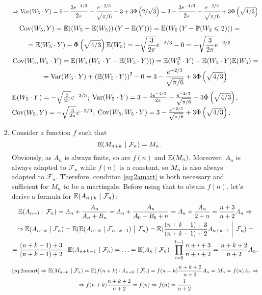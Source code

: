 \documentclass[12pt, a4paper]{article}
\newcommand{\cF}{\mathcal{F}}
\begin{document}
\begin{enumerate}
\begin{multline*}
\end{multline*}
\begin{multline*}
\Rightarrow \operatorname{Var}(W_5 \cdot Y) = 6 - \frac{3e^{-4/3}}{2\pi} - \frac{e^{-2/3}}{\sqrt{\pi/6}} - 3 + 3\Phi\left(2/\sqrt{3}\right) = 3 - \frac{3e^{-4/3}}{2\pi} - \frac{e^{-2/3}}{\sqrt{\pi/6}} + 3\Phi\left(\sqrt{4/3}\right)
\end{multline*}
\begin{multline*}
	\operatorname{Cov}(W_5,Y) = \mathbb{E}(\left(W_5 - \mathbb{E}(W_5)\right)\left(Y - \mathbb{E}(Y)\right)) = \mathbb{E}(W_5 \left(Y - \mathbb{P}(W_3 \leqslant 2)\right)) =\\
	= \mathbb{E}(W_5 \cdot Y) - \Phi\left(\sqrt{4/3}\right) \mathbb{E}(W_5) = -\sqrt{\frac{3}{2\pi}} e^{-2/3} - 0 = -\sqrt{\frac{3}{2\pi}} e^{-2/3}
\end{multline*}
\begin{multline*}
	\operatorname{Cov}(W_5,W_5 \cdot Y) = \mathbb{E}(W_5 \left(W_5 \cdot Y - \mathbb{E}(W_5 \cdot Y)\right)) = \mathbb{E}(W_5^2 \cdot Y) - \mathbb{E}(W_5 \cdot Y) \mathbb{E}(W_5) =\\
	= \operatorname{Var}(W_5 \cdot Y) + \left(\mathbb{E}(W_5 \cdot Y)\right)^2 - 0 = 3 - \frac{e^{-2/3}}{\sqrt{\pi/6}} + 3\Phi\left(\sqrt{4/3}\right)
\end{multline*}
$\mathbb{E}(W_5 \cdot Y) = -\sqrt{\frac{3}{2\pi}} e^{-2/3}$; $\operatorname{Var}(W_5 \cdot Y) = 3 - \frac{3e^{-4/3}}{2\pi} - \frac{e^{-2/3}}{\sqrt{\pi/6}} + 3\Phi\left(\sqrt{4/3}\right)$; $\operatorname{Cov}(W_5,Y) = -\sqrt{\frac{3}{2\pi}} e^{-2/3}$; $\operatorname{Cov}(W_5, W_5 \cdot Y) = 3 - \frac{e^{-2/3}}{\sqrt{\pi/6}} + 3\Phi\left(\sqrt{4/3}\right)$.


\item Consider a function $f$ such that
\begin{equation}\label{eq:2amart}
	\E(M_{n+k}\ |\ \cF_n) = M_n.
\end{equation}
Obviously, as $A_n$ is always finite, so are $f(n)$ and $\mathbb{E}(M_n)$. Moreover, $A_n$ is always adapted to $\cF_n$ while $f(n)$ is a constant, so $M_n$ is also always adapted to $\cF_n$. Therefore, condition \eqref{eq:2amart} is both necessary and sufficient for $M_n$ to be a martingale. Before using that to obtain $f(n)$, let's derive a formula for $\E(A_{n+k}\ |\ \cF_n)$:
\begin{multline*}
	\E(A_{n+1}\ |\ \cF_n) = A_n + \frac{A_n}{A_n + B_n} = A_n + \frac{A_n}{A_0 + B_0 + n} = A_n + \frac{A_n}{2 + n} = \frac{n+3}{n+2} A_n \Rightarrow\\\Rightarrow \E(A_{n+k}\ |\ \cF_n) = \E(\E(A_{n+k}\ |\ \cF_{n+k-1})\ \big|\ \cF_n) = \E(\frac{(n+k-1)+3}{(n+k-1)+2} A_{n+k-1}\ \bigg|\ \cF_n) =\\
	= \frac{(n+k-1)+3}{(n+k-1)+2} \cdot \E(A_{n+k-1}\ |\ \cF_n) = \ldots = \E(A_{n}\ |\ \cF_n) \cdot \prod\limits_{i=0}^{k-1} \frac{n+i+3}{n+i+2} = \frac{n+k+2}{n+2} A_n.
\end{multline*}
\begin{multline*}
	\eqref{eq:2amart} \Rightarrow \E(M_{n+k}\ |\ \cF_n) = \E(f(n+k) \cdot A_{n+k}\ |\ \cF_n) = f(n+k) \frac{n+k+2}{n+2} A_n = M_n = f(n) A_n \Rightarrow\\\Rightarrow f(n+k) \frac{n+k+2}{n+2} = f(n) \Rightarrow f(n) = \dfrac{1}{n+2}
\end{multline*}


\end{enumerate}
\end{document}
